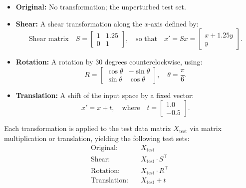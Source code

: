 \begin{itemize}
    \item \textbf{Original:} No transformation; the unperturbed test set.
    
    \item \textbf{Shear:} A shear transformation along the \(x\)-axis defined by:
    \begin{equation}
    \text{Shear matrix} \quad 
    S = \begin{bmatrix} 1 & 1.25 \\ 0 & 1 \end{bmatrix},
    \quad\text{so that} \quad 
    x' = Sx = 
    \begin{bmatrix}
    x + 1.25y \\
    y
    \end{bmatrix}.
    \end{equation}
    
    \item \textbf{Rotation:} A rotation by 30 degrees counterclockwise, using:
    \begin{equation}
    R = 
    \begin{bmatrix}
    \cos \theta & -\sin \theta \\
    \sin \theta & \cos \theta
    \end{bmatrix},
    \quad \theta = \frac{\pi}{6}.
    \end{equation}
    
    \item \textbf{Translation:} A shift of the input space by a fixed vector:
    \begin{equation}
    x' = x + t, \quad \text{where} \quad t = \begin{bmatrix} 1.0 \\ -0.5 \end{bmatrix}.
    \end{equation}
\end{itemize}

\noindent
Each transformation is applied to the test data matrix \( X_{\text{test}} \) via matrix multiplication or translation, yielding the following test sets:
\begin{equation}
\begin{aligned}
\text{Original:} &\quad X_{\text{test}} \\
\text{Shear:}    &\quad X_{\text{test}} \cdot S^\top \\
\text{Rotation:} &\quad X_{\text{test}} \cdot R^\top \\
\text{Translation:} &\quad X_{\text{test}} + t
\end{aligned}
\end{equation}

